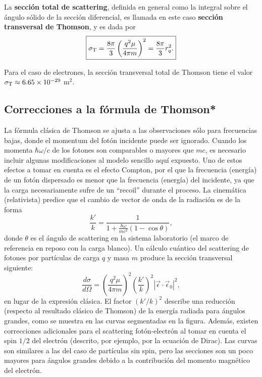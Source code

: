 La \textbf{sección total de scattering}, definida en general como la integral sobre el ángulo sólido de la sección diferencial, es llamada en este caso \textbf{sección transversal de Thomson}, y es dada por
\begin{equation}
\boxed{\sigma_{\rm T}=\frac{8\pi}{3}\left(\frac{q^2\mu}{4\pi m}\right)^2=\frac{8\pi}{3} r_q^2.}
\end{equation}

Para el caso de electrones, la sección transversal total de Thomson tiene el valor $\sigma_{\rm T}\approx 6.65\times 10^{-29}$ m$^2$.

\subsection{Correcciones a la fórmula de Thomson*}
La fórmula clásica de Thomson se ajusta a las observaciones sólo para frecuencias bajas, donde el momentum del fotón incidente puede ser ignorado. Cuando los momenta $\hbar\omega/c$ de los fotones son comparables o mayores que $mc$, es necesario incluir algunas modificaciones al modelo sencillo aquí expuesto. Uno de estos efectos a tomar en cuenta es el efecto Compton, por el que la frecuencia (energía) de un fotón dispersado es menor que la frecuencia (energía) del incidente, ya que la carga necesariamente sufre de un ``recoil'' durante el proceso. La cinemática (relativista) predice que el cambio de vector de onda de la radiación es de la forma
\begin{equation}
\frac{k'}{k}=\frac{1}{1+\frac{\hbar\omega}{mc^2}\left(  1-\cos
\theta\right)  }, \label{Thomson}
\end{equation}
donde $\theta$ es el ángulo de scattering en la sistema laboratorio (el marco
de referencia en reposo con la carga blanco). Un cálculo cuántico del
scattering de fotones por partículas de carga $q$ y masa $m$ produce la sección
transversal siguiente:
\begin{equation}
\frac{d\sigma}{d\Omega}=\left(\frac{q^2\mu}{4\pi m}\right)^2  \left(
\frac{k'}{k}\right)^2\left|  \vec{\epsilon}\cdot\vec{\epsilon}_0\right|
^2 , \label{Thomson-corr}
\end{equation}
en lugar de la expresión clásica. El factor $(k'/k)^2$ describe una
reducción  (respecto al resultado clásico de Thomson) de la energía radiada
para ángulos grandes, como se muestra en las curvas segmentadas en la figura.
Además, existen correcciones adicionales para el scattering fotón-electrón al
tomar en cuenta el spin ${1}/{2}$ del electrón (descrito, por ejemplo, por
la ecuación de Dirac). Las curvas son similares a las del caso de partículas
sin spin, pero las secciones son un poco mayores para ángulos grandes debido a
la contribución del momento magnético del electrón.

